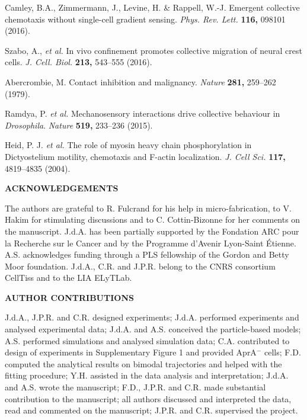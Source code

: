 \documentclass[11pt, twocolumn]{article}
\begin{document}
\begin{thebibliography}{10}
Camley, B.A., Zimmermann, J., Levine, H. \& Rappell, W.-J. Emergent collective chemotaxis without single-cell gradient sensing.
 {\em Phys. Rev. Lett.} \textbf{116,} 098101 (2016).

Szabo, A., \textit{et al.} In vivo confinement promotes collective migration of neural crest cells.
 {\em J. Cell. Biol.} \textbf{213,} 543--555 (2016).

Abercrombie, M. Contact inhibition and malignancy.
 \textit{Nature} \textbf{281,} 259--262 (1979).

Ramdya, P. \textit{et al.} Mechanosensory interactions drive collective behaviour in \textit{Drosophila}.
 \emph{Nature} \textbf{519,} 233--236 (2015).
 
Heid, P. J. \textit{et al.} The role of myosin heavy chain phosphorylation in Dictyostelium motility, chemotaxis and F-actin localization.
{\em J. Cell Sci.} \textbf{117,} 4819--4835 (2004).

\end{thebibliography}

\vspace{1cm}



{\textbf{ACKNOWLEDGEMENTS}}

{\small The authors are grateful to R. Fulcrand for his help in micro-fabrication, to V. Hakim for stimulating
  discussions and to C. Cottin-Bizonne for her comments on the manuscript. J.d.A. has been partially supported by the Fondation
  ARC pour la Recherche sur le Cancer and by the Programme d'Avenir
  Lyon-Saint \'Etienne. A.S. acknowledges funding through a PLS
  fellowship of the Gordon and Betty Moor foundation. J.d.A., C.R. and
  J.P.R. belong to the CNRS consortium CellTiss and to the LIA
  ELyTLab.  } \vspace{24pt}


{\textbf{AUTHOR CONTRIBUTIONS}}

{\small J.d.A., J.P.R. and C.R. designed experiments; J.d.A.
  performed experiments and analysed experimental data; J.d.A. and
  A.S. conceived the particle-based models; A.S. performed simulations
  and analysed simulation data; C.A. contributed to design of
  experiments in Supplementary Figure 1 and provided AprA$^{-}$ cells;
  F.D. computed the analytical results on bimodal trajectories and
  helped with the fitting procedure; Y.H. assisted in the data
  analysis and interpretation; J.d.A. and A.S. wrote the manuscript;
  F.D., J.P.R. and C.R. made substantial contribution to the
  manuscript; all authors discussed and interpreted the data, read and
  commented on the manuscript; J.P.R. and C.R. supervised the project.
}
\end{document}
